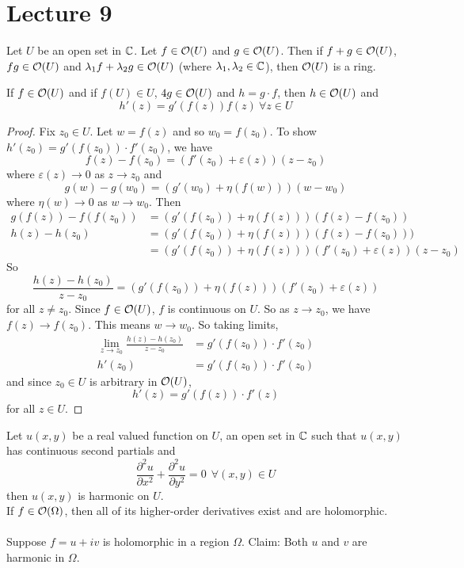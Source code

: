 \documentclass[12pt]{article}
\begin{document}
 \section{Lecture 9} 
 Let $U$ be an open set in $\mathbb{C}$. Let $f \in \mathcal{O}(U)$ and $g \in \mathcal{O}(U)$. Then if $f+g \in \mathcal{O}(U)$, $fg \in \mathcal{O}(U)$ and $\lambda_1f + \lambda_2g \in \mathcal{O}(U)$ (where $\lambda_1,\lambda_2 \in \mathbb{C}$), then $\mathcal{O}(U)$ is a ring. 
 \begin{theorem} If $f \in \mathcal{O}(U)$ and if $f(U) \in U$, $4g \in \mathcal{O}(U)$ and $h = g \cdot f$, then $h \in \mathcal{O}(U)$ and $$h'(z) = g'(f(z))f(z) ~ \forall z \in U $$ \end{theorem} 
 \begin{proof} Fix $z_0 \in U$. Let $w = f(z)$ and so $w_0 = f(z_0)$. To show $h'(z_0) = g'(f(z_0))\cdot f'(z_0)$, we have $$f(z) - f(z_0) = (f'(z_0) + \varepsilon(z))(z-z_0)$$ where $\varepsilon(z) \to 0$ as $z \to z_0$ and $$g(w) - g(w_0) = (g'(w_0) + \eta(f(w)))(w -w_0) $$ where $\eta(w) \to 0$ as $w \to w_0$. Then $$ \begin{aligned} 
 g(f(z)) - f(f(z_0)) &= (g'(f(z_0)) + \eta(f(z)))(f(z) - f(z_0)) \\ 
 h(z) - h(z_0) &= (g'(f(z_0)) + \eta(f(z)))(f(z) - f(z_0))) \\ 
 &= (g'(f(z_0)) + \eta(f(z)))(f'(z_0) + \varepsilon(z))(z-z_0) \end{aligned} $$ 
 So $$ \frac{h(z) - h(z_0)}{z-z_0} = (g'(f(z_0)) + \eta(f(z)))(f'(z_0) + \varepsilon(z))$$ for all $z\neq z_0$. Since $f \in \mathcal{O}(U)$, $f$ is continuous on $U$. So as $z \to z_0$, we have $f(z) \to f(z_0)$. This means $w \to w_0$. So taking limits, $$ \begin{aligned} 
 \lim_{z\to z_0} \frac{h(z) - h(z_0)}{z-z_0} &= g'(f(z_0))\cdot f'(z_0) \\ h'(z_0) &= g'(f(z_0))\cdot f'(z_0) \end{aligned}$$ and since $z_0 \in U$ is arbitrary in $\mathcal{O}(U)$, $$ h'(z) = g'(f(z))\cdot f'(z)$$ for all $z \in U$. \end{proof} 
 Let $u(x,y)$ be a real valued function on $U$, an open set in $\mathbb{C}$ such that $u(x,y)$ has continuous second partials and $$\frac{\partial^2 u}{\partial x^2} + \frac{\partial^2 u}{\partial y^2} = 0 ~~ \forall (x,y) \in U $$ then $u(x,y)$ is harmonic on $U$. \\
 If $f \in \mathcal{O}(\Omega)$, then all of its higher-order derivatives exist and are holomorphic. \\~\\
 Suppose $f = u + iv$ is holomorphic in a region $\Omega$. Claim: Both $u$ and $v$ are harmonic in $\Omega$. 
\end{document}

